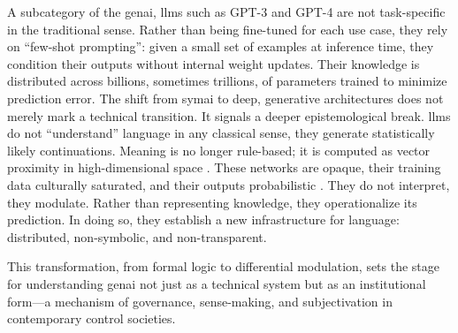 \begin{orangebox}


	A subcategory of the \gls{genai}, \glspl{llm} such as GPT-3 and GPT-4 are not task-specific in the traditional sense. Rather than being fine-tuned for each use case, they rely on ``few-shot prompting'': given a small set of examples at inference time, they condition their outputs without internal weight updates. Their knowledge is distributed across billions, sometimes trillions, of parameters trained to minimize prediction error. The shift from \gls{symai} to deep, generative architectures does not merely mark a technical transition. It signals a deeper epistemological break. \Glspl{llm} do not ``understand'' language in any classical sense, they generate statistically likely continuations. Meaning is no longer rule-based; it is computed as vector proximity in high-dimensional space \parencite[199]{montanari2025}. These networks are opaque, their training data culturally saturated, and their outputs probabilistic \parencite[186]{eloff2021}. They do not interpret, they modulate. Rather than representing knowledge, they operationalize its prediction. In doing so, they establish a new infrastructure for language: distributed, non-symbolic, and non-transparent.

	This transformation, from formal logic to differential modulation, sets the stage for understanding \gls{genai} not just as a technical system but as an institutional form---a mechanism of governance, sense-making, and subjectivation in contemporary control societies.

\end{orangebox}




